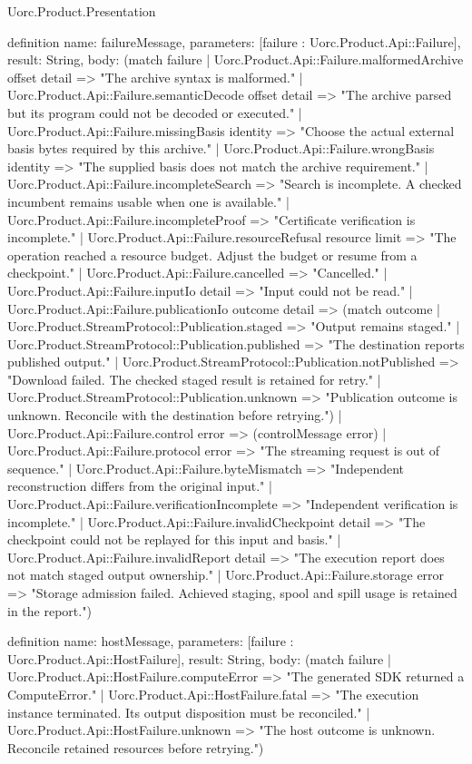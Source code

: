 \begin{lexlean}{Uorc.Product.Presentation}
\begin{semanticmodule}
definition{
  name: failureMessage,
  parameters: [failure : Uorc.Product.Api::Failure],
  result: String,
  body: (match failure
    | Uorc.Product.Api::Failure.malformedArchive offset detail => "The archive syntax is malformed."
    | Uorc.Product.Api::Failure.semanticDecode offset detail => "The archive parsed but its program could not be decoded or executed."
    | Uorc.Product.Api::Failure.missingBasis identity => "Choose the actual external basis bytes required by this archive."
    | Uorc.Product.Api::Failure.wrongBasis identity => "The supplied basis does not match the archive requirement."
    | Uorc.Product.Api::Failure.incompleteSearch => "Search is incomplete. A checked incumbent remains usable when one is available."
    | Uorc.Product.Api::Failure.incompleteProof => "Certificate verification is incomplete."
    | Uorc.Product.Api::Failure.resourceRefusal resource limit => "The operation reached a resource budget. Adjust the budget or resume from a checkpoint."
    | Uorc.Product.Api::Failure.cancelled => "Cancelled."
    | Uorc.Product.Api::Failure.inputIo detail => "Input could not be read."
    | Uorc.Product.Api::Failure.publicationIo outcome detail => (match outcome
      | Uorc.Product.StreamProtocol::Publication.staged => "Output remains staged."
      | Uorc.Product.StreamProtocol::Publication.published => "The destination reports published output."
      | Uorc.Product.StreamProtocol::Publication.notPublished => "Download failed. The checked staged result is retained for retry."
      | Uorc.Product.StreamProtocol::Publication.unknown => "Publication outcome is unknown. Reconcile with the destination before retrying.")
    | Uorc.Product.Api::Failure.control error => (controlMessage error)
    | Uorc.Product.Api::Failure.protocol error => "The streaming request is out of sequence."
    | Uorc.Product.Api::Failure.byteMismatch => "Independent reconstruction differs from the original input."
    | Uorc.Product.Api::Failure.verificationIncomplete => "Independent verification is incomplete."
    | Uorc.Product.Api::Failure.invalidCheckpoint detail => "The checkpoint could not be replayed for this input and basis."
    | Uorc.Product.Api::Failure.invalidReport detail => "The execution report does not match staged output ownership."
    | Uorc.Product.Api::Failure.storage error => "Storage admission failed. Achieved staging, spool and spill usage is retained in the report.")
}

definition{
  name: hostMessage,
  parameters: [failure : Uorc.Product.Api::HostFailure],
  result: String,
  body: (match failure
    | Uorc.Product.Api::HostFailure.computeError => "The generated SDK returned a ComputeError."
    | Uorc.Product.Api::HostFailure.fatal => "The execution instance terminated. Its output disposition must be reconciled."
    | Uorc.Product.Api::HostFailure.unknown => "The host outcome is unknown. Reconcile retained resources before retrying.")
}


\end{semanticmodule}
\end{lexlean}
